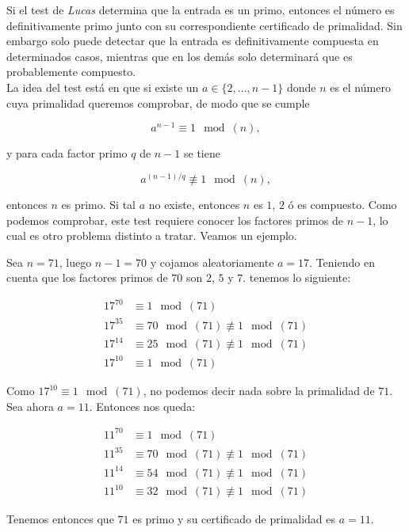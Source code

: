 Si el test de \textit{Lucas} determina que la entrada es un primo, entonces el número es definitivamente primo junto con su correspondiente certificado de primalidad. Sin embargo solo puede detectar que la entrada es definitivamente compuesta en determinados casos, mientras que en los demás solo determinará que es probablemente compuesto.\\

La idea del test está en que si existe un $a \in \{2,\dotso, n-1\}$ donde $n$ es el número cuya primalidad queremos comprobar, de modo que se cumple

\begin{equation}
a^{n-1} \equiv 1 \mod(n),
\end{equation}

y para cada factor primo $q$ de $n-1$ se tiene

\begin{equation}
a^{(n-1)/q} \not\equiv 1 \mod(n),
\end{equation}

entonces $n$ es primo. Si tal $a$ no existe, entonces $n$ es $1$, $2$ ó es compuesto. Como podemos comprobar, este test requiere conocer los factores primos de $n-1$, lo cual es otro problema distinto a tratar. Veamos un ejemplo.

\begin{ejemplo}
	Sea $n = 71$, luego $n-1 = 70$ y cojamos aleatoriamente $a = 17$. Teniendo en cuenta que los factores primos de $70$ son $2$, $5$ y $7$. tenemos lo siguiente:
	
	\begin{align}
	17^{70} &\equiv 1 \mod(71)\\
	17^{35} &\equiv 70 \mod(71) \not\equiv 1 \mod(71)\\
	17^{14} &\equiv 25 \mod(71) \not\equiv 1 \mod(71)\\
	17^{10} &\equiv 1 \mod(71)
	\end{align}
	
	Como $17^{10} \equiv 1 \mod(71)$, no podemos decir nada sobre la primalidad de $71$. Sea ahora $a = 11$. Entonces nos queda:
	
	\begin{align}
	11^{70} &\equiv 1 \mod(71)\\
	11^{35} &\equiv 70 \mod(71) \not\equiv 1 \mod(71)\\
	11^{14} &\equiv 54 \mod(71) \not\equiv 1 \mod(71)\\
	11^{10} &\equiv 32 \mod(71) \not\equiv 1 \mod(71)
	\end{align}
	
	Tenemos entonces que $71$ es primo y su certificado de primalidad es $a = 11$.
\end{ejemplo}

